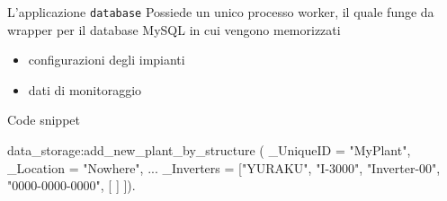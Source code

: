 \documentclass{beamer}
\newcommand{\red}[1]{\textcolor[rgb]{.8,0,0}{#1}}
\newcommand{\green}[1]{\textcolor[rgb]{0,.6,.1}{#1}}
\begin{document}
%
\begin{frame}[fragile]{L'applicazione \texttt{database}}
  Possiede un unico processo \green{worker}, il quale 
  funge da wrapper per il database \red{MySQL} in cui vengono memorizzati
  \begin{itemize}
  \item configurazioni degli impianti
  \item dati di monitoraggio
  \end{itemize}
\begin{exampleblock}{Code snippet}
\begin{semiverbatim}
data_storage:\red{add_new_plant_by_structure} (
      _UniqueID = "MyPlant", 
      _Location = "Nowhere",
      ...
      _Inverters = [{{"YURAKU", "I-3000"}, 
                    "Inverter-00", "0000-0000-0000", 
                    [%
                     ]} ]).
\end{semiverbatim}
\end{exampleblock}  
\end{frame}
%

%
%

%
%

%















\end{document}
